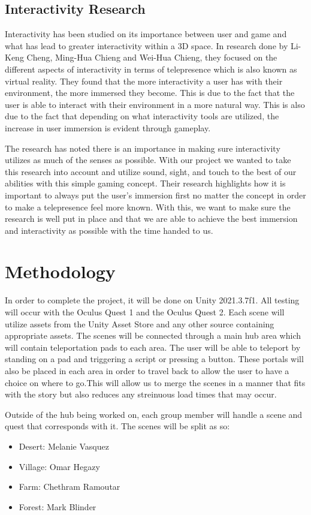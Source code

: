 \documentclass{vgtc}                          %
\begin{document}
\subsection*{Interactivity Research}
Interactivity has been studied on its importance between user and game and what has lead to greater interactivity within a 3D space. In research done by Li-Keng Cheng, Ming-Hua Chieng and Wei-Hua Chieng\cite{cheng_2014}, they focused on the different aspects of interactivity in terms of telepresence which is also known as virtual
reality. They found that the more interactivity a user has with their environment, the more immersed they become. This is due to the fact that the user is able to interact with their environment in a more natural way. This is also due to the fact that depending on what interactivity tools are utilized, the increase in user immersion
is evident through gameplay.

The research has noted there is an importance in making sure interactivity utilizes as much of the senses as possible. With our project we wanted to take this research into account and utilize sound, sight, and touch to the best of our abilities with this simple gaming concept. Their research highlights how it is important to always put the user's
immersion first no matter the concept in order to make a telepresence feel more known. With this, we want to make sure the research is well put in place and that we are able to achieve the best immersion and interactivity as possible with the time handed to us.
\section{Methodology}
In order to complete the project, it will be done on Unity 2021.3.7f1. All testing will occur with the Oculus Quest 1 and the Oculus Quest 2. Each scene will utilize assets from the Unity Asset Store and any other
source containing appropriate assets. The scenes will be connected through a main hub area which will contain teleportation pads to each area. The user will be able to teleport by standing on a pad and triggering
a script or pressing a button. These portals will also be placed in each area
in order to travel back to allow the user to have a choice on where to go.This will allow us to merge the scenes in a manner that fits with the story but also reduces any streinuous load times that may
occur.

Outside of the hub being worked on, each group member will handle a scene and quest that corresponds with it. The scenes will be split as so:
\begin{itemize}
  \item Desert: Melanie Vasquez
  \item Village: Omar Hegazy
  \item Farm: Chethram Ramoutar
  \item Forest: Mark Blinder
\end{itemize}
\end{document}

